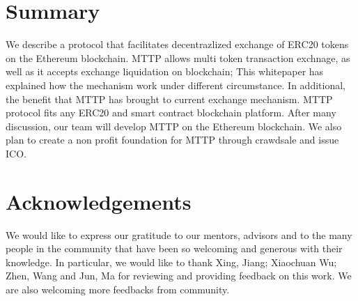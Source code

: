 \documentclass[UTF8,nofonts]{article}
\begin{document}

\section{Summary\label{sec: summary}}

We describe a protocol that facilitates decentrazlized exchange of ERC20 tokens on the Ethereum blockchain. MTTP allows multi token transaction exchnage,  as well as it accepts exchange liquidation on blockchain; This whitepaper has explained how the mechanism work under different circumstance. In additional,  the benefit that MTTP has brought to current exchange mechanism.
MTTP protocol fits any ERC20 and smart contract blockchain platform. After many discussion,  our team will develop MTTP on the Ethereum blockchain.
We also plan to create a non profit foundation for MTTP through crawdsale and issue ICO.

\section{Acknowledgements\label{sec: acknowledgement}}

We would like to express our gratitude to our mentors,  advisors and to the many people in the community that have been so welcoming and generous with their knowledge. In particular,  we would like to thank Xing,  Jiang; Xiaochuan Wu; Zhen, Wang and Jun, Ma for reviewing and providing feedback on this work. We are also welcoming more feedbacks from community.

\newpage



\newpage
\end{document}
